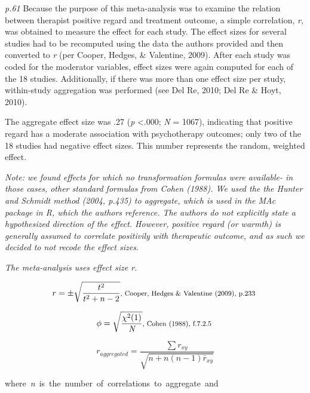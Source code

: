 \documentclass{article}
\begin{document}
\textit {p.61} Because the purpose of this meta-analysis was to examine the relation between therapist positive regard and treatment outcome, a simple correlation, \textit{r}, was obtained to measure the effect for each study. The effect sizes for several studies had to be recomputed using the data the authors provided and then converted to \textit{r} (per Cooper, Hedges, \& Valentine, 2009). After each study was coded for the moderator variables, effect sizes were again computed for each of the 18 studies. Additionally, if there was more than one effect size per study, within-study aggregation was performed (see Del Re, 2010; Del Re \& Hoyt, 2010).

The aggregate effect size was .27 (\textit{p} \textless .000; \textit{N} = 1067), indicating that positive regard has a moderate association with psychotherapy outcomes; only two of the 18 studies had negative effect sizes. This number represents the random, weighted effect.

\vspace{3 mm}
\textit{Note: we found effects for which no transformation formulas were available- in those cases, other standard formulas from Cohen (1988). We used the the Hunter and Schmidt method (2004, p.435) to aggregate, which is used in the MAc package in R, which the authors reference. The authors do not explicitly state a hypothesized direction of the effect. However, positive regard (or warmth) is generally assumed to correlate positivily with therapeutic outcome, and as such we decided to not recode the effect sizes.  }

\vspace{3mm}
\textit{The meta-analysis uses effect size r.}

\begin{equation*}
r = \pm{\sqrt {\frac {t^{2}}{t^{2}+n-2}}} \mbox{\footnotesize, Cooper, Hedges \& Valentine (2009), p.233 }
\end{equation*}

\begin{equation*}
\phi = {\sqrt {\frac {\chi ^{2}(1)}{\textit{N}}}} \mbox{\footnotesize, Cohen (1988), f.7.2.5 } 
\end{equation*}

\begin{equation*}
r_{aggregated}=\frac{\sum r_{xy}}{\sqrt{n+n(n-1)\bar{r}_{xy}}} 
\end{equation*}

\mbox{\footnotesize where \textit{n} is the number of correlations to aggregate and }
\end{document}
